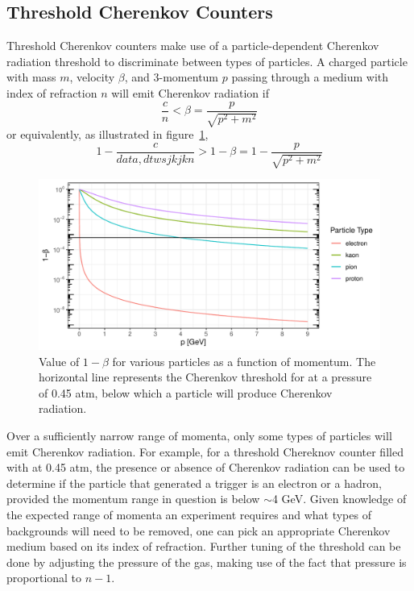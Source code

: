 \subsection{Threshold Cherenkov Counters}
Threshold Cherenkov counters make use of a particle-dependent Cherenkov
radiation threshold to discriminate between types of particles.
A charged particle with mass $m$, velocity $\beta$, and 3-momentum $p$ passing
through a medium with index of refraction $n$ will emit Cherenkov radiation if
\begin{equation}
    \frac{c}{n} < \beta = \frac{p}{\sqrt{p^2+m^2}}
\end{equation}
or equivalently, as illustrated in figure~\ref{fig:hms_cer_threshold},
\begin{equation}
    1-\frac{c}{data,dtwsjkjkn} > 1-\beta = 1-\frac{p}{\sqrt{p^2+m^2}}
\end{equation}

\begin{figure}[!h]
    \centering
    \includegraphics[width=1.0\textwidth]{chap3/hms_cer_threshold.pdf}
    \caption{Value of $1-\beta$ for various particles as a function of
            momentum. The horizontal line represents the Cherenkov threshold
            for  at a pressure of 0.45 atm, below which a particle
            will produce Cherenkov radiation.
            }
    \label{fig:hms_cer_threshold}
\end{figure}

Over a sufficiently narrow range of momenta, only some types of particles will
emit Cherenkov radiation.
For example, for a threshold Chereknov counter filled with  at
0.45 atm, the presence or absence of Cherenkov radiation can be used to
determine if the particle that generated a trigger is an electron or a hadron,
provided the momentum range in question is below $\sim$4 \si{\giga\eV}.
Given knowledge of the expected range of momenta an experiment requires and
what types of backgrounds will need to be removed, one can pick an appropriate
Cherenkov medium based on its index of refraction. Further tuning of the
threshold can be done by adjusting the pressure of the gas, making use of
the fact that pressure is proportional to $n-1$.

